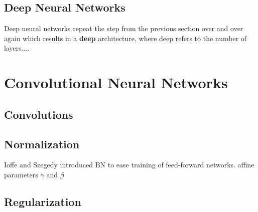 \subsection{Deep Neural Networks}
Deep neural networks repeat the step from the previous section over and over again which results in a \textbf{deep} architecture, where deep refers to the number of layers....


\section[Convolutional NNs]{Convolutional Neural Networks}
\subsection{Convolutions}


\subsection{Normalization}
Ioffe and Szegedy introduced BN to ease training of feed-forward networks.
affine parameters $\gamma$ and $\beta$

\subsection{Regularization}

